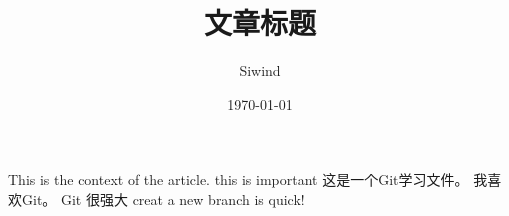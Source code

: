 \documentclass[UTF8]{ctexart}
\title{文章标题}
\author{Siwind}
\date{\today}
\begin{document}
    \maketitle
    This is the context of the article.
    this is important
    这是一个Git学习文件。
    我喜欢Git。
    Git 很强大
    creat a new branch is quick!
    
\end{document}
